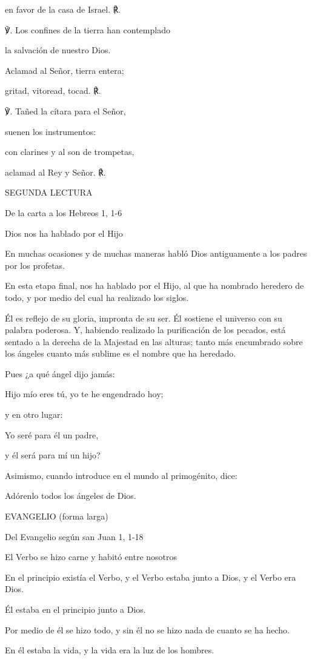 en favor de la casa de Israel. ℟.

℣. Los confines de la tierra han contemplado

la salvación de nuestro Dios.

Aclamad al Señor, tierra entera;

gritad, vitoread, tocad. ℟.

℣. Tañed la cítara para el Señor,

suenen los instrumentos:

con clarines y al son de trompetas,

aclamad al Rey y Señor. ℟.

SEGUNDA LECTURA

De la carta a los Hebreos 1, 1-6

Dios nos ha hablado por el Hijo

En muchas ocasiones y de muchas maneras habló Dios antiguamente a los
padres por los profetas.

En esta etapa final, nos ha hablado por el Hijo, al que ha nombrado
heredero de todo, y por medio del cual ha realizado los siglos.

Él es reflejo de su gloria, impronta de su ser. Él sostiene el universo
con su palabra poderosa. Y, habiendo realizado la purificación de los
pecados, está sentado a la derecha de la Majestad en las alturas; tanto
más encumbrado sobre los ángeles cuanto más sublime es el nombre que ha
heredado.

Pues ¿a qué ángel dijo jamás:

Hijo mío eres tú, yo te he engendrado hoy;

y en otro lugar:

Yo seré para él un padre,

y él será para mí un hijo?

Asimismo, cuando introduce en el mundo al primogénito, dice:

Adórenlo todos los ángeles de Dios.

EVANGELIO (forma larga)

Del Evangelio según san Juan 1, 1-18

El Verbo se hizo carne y habitó entre nosotros

En el principio existía el Verbo, y el Verbo estaba junto a Dios, y el
Verbo era Dios.

Él estaba en el principio junto a Dios.

Por medio de él se hizo todo, y sin él no se hizo nada de cuanto se ha
hecho.

En él estaba la vida, y la vida era la luz de los hombres.

